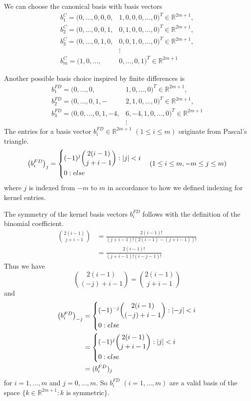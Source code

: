 \documentclass[twoside,a4paper]{article}
\begin{document}
We can choose the canonical basis with basis vectors
\begin{align*}
	b_1^C = (0, \dots, 0, 0, 0, &1, 0, 0, 0, \dots, 0)^T \in \mathbb{R}^{2m+1}, \\
	b_2^C = (0, \dots, 0, 0, 1, &0, 1, 0, 0, \dots, 0)^T \in \mathbb{R}^{2m+1}, \\
	b_3^C = (0, \dots, 0, 1, 0, &0, 0, 1, 0, \dots, 0)^T \in \mathbb{R}^{2m+1}, \\
	&\vdots \\
	b_m^C = (1, 0, \dots, &0, \dots, 0, 1)^T \in \mathbb{R}^{2m+1}
\end{align*}

Another possible basis choice inspired by finite differences is
\begin{align*}
	b_1^{FD} = (0, \dots, 0,& 1,0, \dots, 0)^T \in \mathbb{R}^{2m+1},\\
	b_2^{FD} = (0, \dots, 0, 1,-&2,1, 0, \dots, 0)^T \in \mathbb{R}^{2m+1},\\
	b_3^{FD} = (0, 0, \dots, 0, 1,-4,& 6,-4,1, 0, \dots, 0)^T \in \mathbb{R}^{2m+1} \\
	&\vdots
\end{align*}
The entries for a basis vector $b_i^{FD} \in \mathbb{R}^{2m+1}$ $(1 \leq i \leq m)$ 
originate from Pascal's triangle.
\begin{equation*}
	\left( b_i^{FD} \right)_j = \begin{dcases}
		(-1)^j \binom{2(i-1)}{j+i-1} : \left|{j}\right| < i \\
		0 : else
	\end{dcases}
	\quad (1 \leq i \leq m, -m \leq j \leq m )
\end{equation*}
where $j$ is indexed from $-m$ to $m$ in accordance to how we defined indexing for kernel entries.

The symmetry of the kernel basis vectors $b_i^{FD}$ follows with the definition of the binomial coefficient.
\begin{align*}
	\binom{2(i-1)}{j+i-1} &= \frac{2(i-1)!}{(j+i-1)!(2(i-1)-(j+i-1))!} \\
	&= \frac{2(i-1)!}{(j+i-1)!(i-j-1)!}
\end{align*}
Thus we have
\begin{equation*}
	\binom{2(i-1)}{(-j)+i-1} = \binom{2(i-1)}{j+i-1}
\end{equation*}
and
\begin{align*}
	\left( b_i^{FD} \right)_{-j} &= \begin{dcases}
		(-1)^{-j} \binom{2(i-1)}{(-j)+i-1} : \left|{-j}\right| < i \\
		0 : else
	\end{dcases} \\
	&= \begin{dcases}
		(-1)^{j} \binom{2(i-1)}{j+i-1} : \left|{j}\right| < i \\
		0 : else
	\end{dcases} \\
	&= (b_i^{FD})_j
\end{align*}
for $i=1, \dots, m$ and $j= 0, \dots, m$. So $b_i^{FD}$ $(i=1, \dots, m)$ are a valid basis of
the space $\{ k \in \mathbb{R}^{2m+1} : k \text{ is symmetric} \}$.
\end{document}
